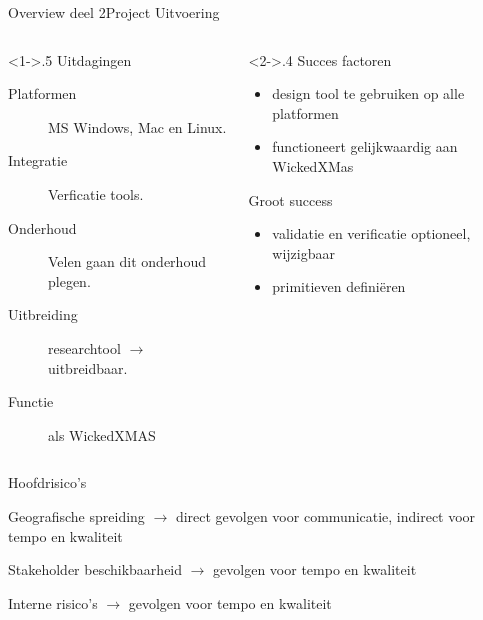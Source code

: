 \begin{frame}[label=challanges]{Overview deel 2}{Project Uitvoering}

    \begin{columns}[t]
        \begin{column}<1->{.5\textwidth}
	    Uitdagingen
	    \begin{description}
	        \item[Platformen] {\tiny MS Windows, Mac en Linux.}
	        \item[Integratie] {\tiny Verficatie tools.}
	        \item[Onderhoud] {\tiny Velen gaan dit onderhoud plegen.}
		\item[Uitbreiding] {\tiny researchtool $\rightarrow$ uitbreidbaar.}
		\item[Functie] {\tiny als WickedXMAS}
	    \end{description}


        \end{column}
        \begin{column}<2->{.4\textwidth}
	    Succes factoren
	    \begin{itemize}
	        \item {\tiny design tool te gebruiken op alle platformen}
	        \item {\tiny functioneert gelijkwaardig aan WickedXMas}
	    \end{itemize}
	    Groot success
	    \begin{itemize}
	        \item {\tiny validatie en verificatie optioneel, wijzigbaar}
	        \item {\tiny primitieven defini\"{e}ren}
	    \end{itemize}
        \end{column}

    \end{columns}


\end{frame}

\begin{frame}[fragile]{Hoofdrisico's}

    \par{\sf Geografische spreiding \pause $\rightarrow$ direct gevolgen voor communicatie, indirect voor tempo en kwaliteit}
    \pause
    \vspace{3em}
    \par{\sf Stakeholder beschikbaarheid \pause $\rightarrow$ gevolgen voor tempo en kwaliteit}
    \pause
    \vspace{3em}
    \par{\sf Interne risico's \pause $\rightarrow$ gevolgen voor tempo en kwaliteit}

\end{frame}


